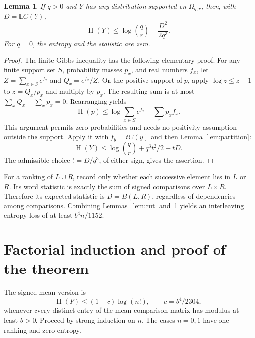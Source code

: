 \documentclass[11pt,a4paper]{article}
\newtheorem{lemma}[theorem]{Lemma}
\newcommand{\E}{\mathbb E}
\DeclareMathOperator{\Ent}{H}
\begin{document}
\begin{lemma}\label{lem:wordentropy}
If $q>0$ and $Y$ has any distribution supported on $\Omega_{q,r}$, then,
with $D=\E C(Y)$,
\begin{equation}\label{eq:wordentropy}
\Ent(Y)\leq\log\binom qr-\frac{D^2}{2q^3}.
\end{equation}
For $q=0$, the entropy and the statistic are zero.
\end{lemma}
\begin{proof}
The finite Gibbs inequality has the following elementary proof.
For any finite support set $S$, probability masses $p_x$, and real numbers
$f_x$, let $Z=\sum_{x\in S}e^{f_x}$ and $Q_x=e^{f_x}/Z$. On the positive
support of $p$, apply $\log z\leq z-1$ to $z=Q_x/p_x$ and multiply by $p_x$.
The resulting sum is at most $\sum_xQ_x-\sum_xp_x=0$. Rearranging yields
\[
\Ent(p)\leq\log\sum_{x\in S}e^{f_x}-\sum_xp_x f_x.
\]
This argument permits zero probabilities and needs no positivity assumption
outside the support. Apply it with $f_y=tC(y)$ and then
Lemma~\ref{lem:partition}:
\[
\Ent(Y)\leq\log\binom qr+q^3t^2/2-tD.
\]
The admissible choice $t=D/q^3$, of either sign, gives the assertion.
\end{proof}

For a ranking of $L\cup R$, record only whether each successive element
lies in $L$ or $R$. Its word statistic is exactly the sum of signed
comparisons over $L\times R$. Therefore its expected statistic is
$D=B(L,R)$, regardless of dependencies among comparisons. Combining
Lemmas~\ref{lem:cut} and~\ref{lem:wordentropy} yields an interleaving entropy
loss of at least $b^4n/1152$.

\section{Factorial induction and proof of the theorem}

The signed-mean version is
\begin{equation}\label{eq:signed}
\Ent(P)\leq(1-c)\log(n!),\qquad c=b^4/2304,
\end{equation}
whenever every distinct entry of the mean comparison matrix has modulus
at least $b>0$. Proceed by strong induction on $n$. The cases $n=0,1$ have
one ranking and zero entropy.
\end{document}
